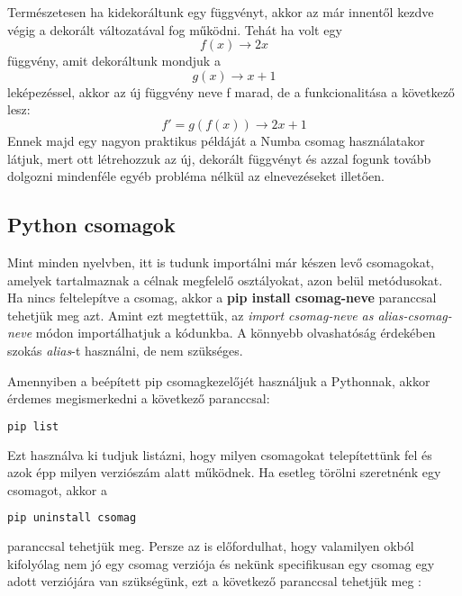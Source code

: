 \documentclass{article}
\theoremstyle{definition}
\theoremstyle{theorem}
\begin{document}
Természetesen ha kidekoráltunk egy függvényt, akkor az már innentől kezdve végig a dekorált változatával fog működni. Tehát ha volt egy
\begin{equation*}
    f(x) \rightarrow 2x
\end{equation*}
függvény, amit dekoráltunk mondjuk a
\begin{equation*}
    g(x) \rightarrow x + 1
\end{equation*}
leképezéssel, akkor az új függvény neve f marad, de a funkcionalitása a következő lesz:
\begin{equation*}
    f' = g(f(x)) \rightarrow 2x + 1
\end{equation*}
Ennek majd egy nagyon praktikus példáját a Numba csomag használatakor látjuk, mert ott létrehozzuk az új, dekorált függvényt és azzal fogunk tovább dolgozni mindenféle egyéb probléma nélkül az elnevezéseket illetően.
\subsection{Python csomagok}
Mint minden nyelvben, itt is tudunk importálni már készen levő csomagokat, amelyek tartalmaznak a célnak megfelelő osztályokat, azon belül metódusokat. Ha nincs feltelepítve a csomag, akkor a \textbf{pip install csomag-neve} paranccsal tehetjük meg azt.
Amint ezt megtettük, az \textit{import csomag-neve as alias-csomag-neve} módon importálhatjuk a kódunkba. A könnyebb olvashatóság érdekében szokás \textit{alias}-t használni, de nem szükséges.


Amennyiben a beépített pip csomagkezelőjét használjuk a Pythonnak, akkor érdemes megismerkedni a következő paranccsal:
\begin{lstlisting}[language=bash]
    pip list
\end{lstlisting}
Ezt használva ki tudjuk listázni, hogy milyen csomagokat telepítettünk fel és azok épp milyen verziószám alatt működnek. \newline
Ha esetleg törölni szeretnénk egy csomagot, akkor a
\begin{lstlisting}[language=bash]
    pip uninstall csomag
\end{lstlisting}paranccsal tehetjük meg. Persze az is előfordulhat, hogy valamilyen okból kifolyólag nem jó egy csomag verziója és nekünk specifikusan egy csomag egy adott verziójára van szükségünk, ezt a következő paranccsal tehetjük meg :
\end{document}
